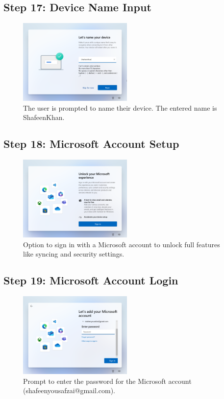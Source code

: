 \documentclass{article}
\begin{document}
\subsection{Step 17: Device Name Input}
\begin{figure}[H]
    \centering
    \includegraphics[width=0.5\textwidth]{2024-09-17_15-21-15.png}
    \caption{The user is prompted to name their device. The entered name is ShafeenKhan.}
\end{figure}

\subsection{Step 18: Microsoft Account Setup}
\begin{figure}[H]
    \centering
    \includegraphics[width=0.5\textwidth]{2024-09-17_15-22-22.png}
    \caption{Option to sign in with a Microsoft account to unlock full features like syncing and security settings.}
\end{figure}

\subsection{Step 19: Microsoft Account Login}
\begin{figure}[H]
    \centering
    \includegraphics[width=0.5\textwidth]{2024-09-17_15-24-25.png}
    \caption{Prompt to enter the password for the Microsoft account (shafeenyousafzai@gmail.com).}
\end{figure}
\end{document}

